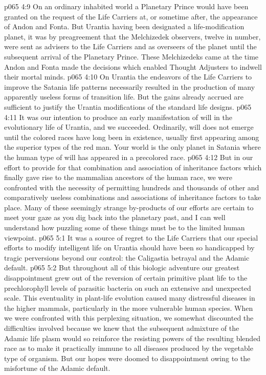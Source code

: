 \vs p065 4:9 On an ordinary inhabited world a Planetary Prince would have been granted on the request of the Life Carriers at, or sometime after, the appearance of Andon and Fonta. But Urantia having been designated a life\hyp{}modification planet, it was by preagreement that the Melchizedek observers, twelve in number, were sent as advisers to the Life Carriers and as overseers of the planet until the subsequent arrival of the Planetary Prince. These Melchizedeks came at the time Andon and Fonta made the decisions which enabled Thought Adjusters to indwell their mortal minds.
\pc \vs p065 4:10 On Urantia the endeavors of the Life Carriers to improve the Satania life patterns necessarily resulted in the production of many apparently useless forms of transition life. But the gains already accrued are sufficient to justify the Urantia modifications of the standard life designs.
\vs p065 4:11 It was our intention to produce an early manifestation of will in the evolutionary life of Urantia, and we succeeded. Ordinarily, will does not emerge until the colored races have long been in existence, usually first appearing among the superior types of the red man. Your world is the only planet in Satania where the human type of will has appeared in a precolored race.
\vs p065 4:12 But in our effort to provide for that combination and association of inheritance factors which finally gave rise to the mammalian ancestors of the human race, we were confronted with the necessity of permitting hundreds and thousands of other and comparatively useless combinations and associations of inheritance factors to take place. Many of these seemingly strange by\hyp{}products of our efforts are certain to meet your gaze as you dig back into the planetary past, and I can well understand how puzzling some of these things must be to the limited human viewpoint.
\vs p065 5:1 It was a source of regret to the Life Carriers that our special efforts to modify intelligent life on Urantia should have been so handicapped by tragic perversions beyond our control: the Caligastia betrayal and the Adamic default.
\vs p065 5:2 But throughout all of this biologic adventure our greatest disappointment grew out of the reversion of certain primitive plant life to the prechlorophyll levels of parasitic bacteria on such an extensive and unexpected scale. This eventuality in plant\hyp{}life evolution caused many distressful diseases in the higher mammals, particularly in the more vulnerable human species. When we were confronted with this perplexing situation, we somewhat discounted the difficulties involved because we knew that the subsequent admixture of the Adamic life plasm would so reinforce the resisting powers of the resulting blended race as to make it practically immune to all diseases produced by the vegetable type of organism. But our hopes were doomed to disappointment owing to the misfortune of the Adamic default.
